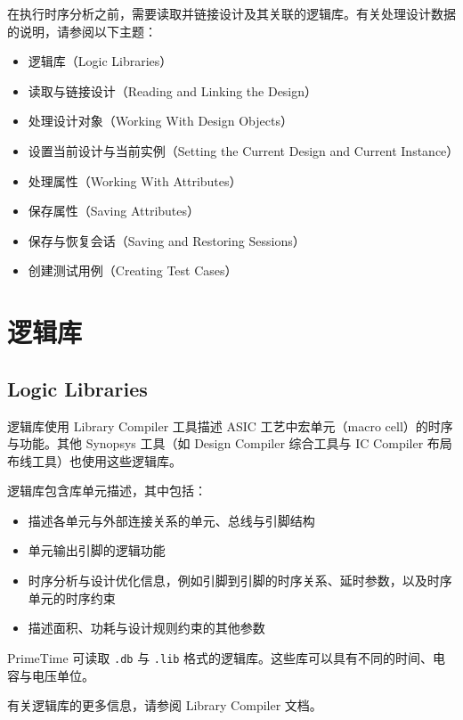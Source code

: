 \label{chap:data}

在执行时序分析之前，需要读取并链接设计及其关联的逻辑库。有关处理设计数据的说明，请参阅以下主题：
\begin{itemize}
  \item 逻辑库（Logic Libraries）
  \item 读取与链接设计（Reading and Linking the Design）
  \item 处理设计对象（Working With Design Objects）
  \item 设置当前设计与当前实例（Setting the Current Design and Current Instance）
  \item 处理属性（Working With Attributes）
  \item 保存属性（Saving Attributes）
  \item 保存与恢复会话（Saving and Restoring Sessions）
  \item 创建测试用例（Creating Test Cases）
\end{itemize}

\section{逻辑库}
\subsection*{Logic Libraries}

逻辑库使用 Library Compiler 工具描述 ASIC 工艺中宏单元（macro cell）的时序与功能。其他 Synopsys 工具（如 Design Compiler 综合工具与 IC Compiler 布局布线工具）也使用这些逻辑库。

逻辑库包含库单元描述，其中包括：
\begin{itemize}
  \item 描述各单元与外部连接关系的单元、总线与引脚结构
  \item 单元输出引脚的逻辑功能
  \item 时序分析与设计优化信息，例如引脚到引脚的时序关系、延时参数，以及时序单元的时序约束
  \item 描述面积、功耗与设计规则约束的其他参数
\end{itemize}

PrimeTime 可读取 \texttt{.db} 与 \texttt{.lib} 格式的逻辑库。这些库可以具有不同的时间、电容与电压单位。

有关逻辑库的更多信息，请参阅 Library Compiler 文档。

